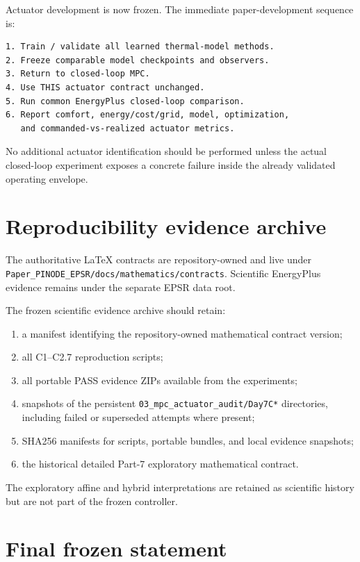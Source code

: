 \documentclass[11pt]{article}
\begin{document}
Actuator development is now frozen.  The immediate paper-development sequence
is:
\begin{verbatim}
1. Train / validate all learned thermal-model methods.
2. Freeze comparable model checkpoints and observers.
3. Return to closed-loop MPC.
4. Use THIS actuator contract unchanged.
5. Run common EnergyPlus closed-loop comparison.
6. Report comfort, energy/cost/grid, model, optimization,
   and commanded-vs-realized actuator metrics.
\end{verbatim}

No additional actuator identification should be performed unless the actual
closed-loop experiment exposes a concrete failure inside the already validated
operating envelope.

\section{Reproducibility evidence archive}

The authoritative LaTeX contracts are repository-owned and live under
\texttt{Paper\_PINODE\_EPSR/docs/mathematics/contracts}.  Scientific
EnergyPlus evidence remains under the separate EPSR data root.

The frozen scientific evidence archive should retain:
\begin{enumerate}[leftmargin=2em]
\item a manifest identifying the repository-owned mathematical contract version;
\item all C1--C2.7 reproduction scripts;
\item all portable PASS evidence ZIPs available from the experiments;
\item snapshots of the persistent
\texttt{03\_mpc\_actuator\_audit/Day7C*} directories, including failed or
superseded attempts where present;
\item SHA256 manifests for scripts, portable bundles, and local evidence
snapshots;
\item the historical detailed Part-7 exploratory mathematical contract.
\end{enumerate}

The exploratory affine and hybrid interpretations are retained as scientific
history but are not part of the frozen controller.

\section{Final frozen statement}
\end{document}
